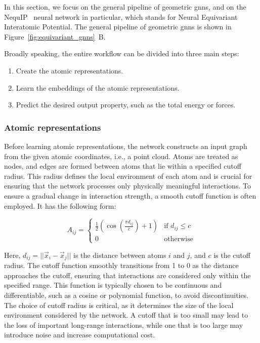 In this section, we focus on the general pipeline of geometric \acp{gnn}, and on the NequIP~\citep{batznerE3equivariantGraphNeural2022} neural network in particular, which stands for Neural Equivariant Interatomic Potential. The general pipeline of geometric \acp{gnn} is shown in Figure~\ref{fig:equivariant_gnns}~B.

Broadly speaking, the entire workflow can be divided into three main steps:
\begin{enumerate}
    \item Create the atomic representations.
    \item Learn the embeddings of the atomic representations.
    \item Predict the desired output property, such as the total energy or forces.
\end{enumerate}

\subsubsection{Atomic representations}
Before learning atomic representations, the network constructs an input graph from the given atomic coordinates, i.e., a point cloud. Atoms are treated as nodes, and edges are formed between atoms that lie within a specified cutoff radius. This radius defines the local environment of each atom and is crucial for ensuring that the network processes only physically meaningful interactions. To ensure a gradual change in interaction strength, a smooth cutoff function is often employed. It has the following form:

\begin{equation}
    A_{ij} = \begin{cases}
    \frac{1}{2}\left(\cos\left(\frac{\pi d_{ij}}{c}\right) + 1\right) & \text{if } d_{ij} \leq c \\
    0 & \text{otherwise}
    \end{cases}
    \label{eq:smooth_cutoff}
\end{equation}

Here, $d_{ij} = ||\vec{x}_i - \vec{x}_j||$ is the distance between atoms $i$ and $j$, and $c$ is the cutoff radius. The cutoff function smoothly transitions from 1 to 0 as the distance approaches the cutoff, ensuring that interactions are considered only within the specified range. This function is typically chosen to be continuous and differentiable, such as a cosine or polynomial function, to avoid discontinuities. The choice of cutoff radius is critical, as it determines the size of the local environment considered by the network. A cutoff that is too small may lead to the loss of important long-range interactions, while one that is too large may introduce noise and increase computational cost.

